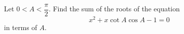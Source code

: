 Let $0<A<\dfrac\pi2$. Find the sum of the roots of the equation
\[x^2+x\cot A\cos A-1=0\]
in terms of $A$.
